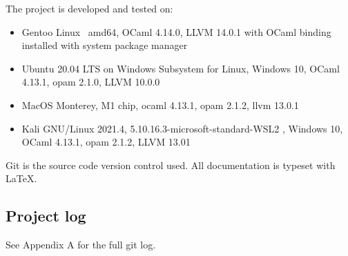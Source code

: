 The project is developed and tested on:

\begin{itemize}
\item Gentoo Linux ~amd64, OCaml 4.14.0, LLVM 14.0.1 with OCaml binding installed with system package manager
\item Ubuntu 20.04 LTS on Windows Subsystem for Linux, Windows 10, OCaml 4.13.1, opam 2.1.0, LLVM 10.0.0
\item MacOS Monterey, M1 chip, ocaml 4.13.1, opam 2.1.2, llvm 13.0.1
\item Kali GNU/Linux 2021.4, 5.10.16.3-microsoft-standard-WSL2 , Windows 10, OCaml 4.13.1, opam 2.1.2, LLVM 13.01
\end{itemize}

Git is the source code version control used. All documentation is typeset with \LaTeX .

\subsection{Project log}

See Appendix A for the full git log.
